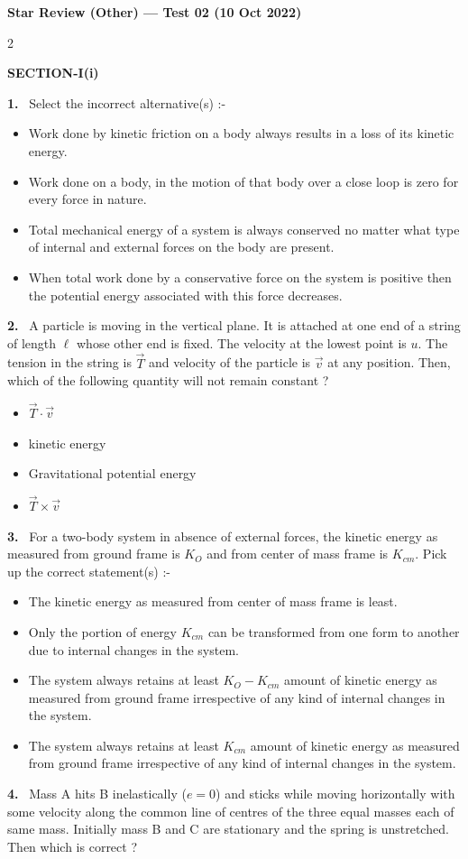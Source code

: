 \documentclass[10pt]{extarticle}
\newcommand{\papersec}[1]{\par\bigskip{\centering\Large\bfseries PAPER-#1\par}\medskip}
\newcommand{\partsec}[2]{\par\medskip\noindent{\large\bfseries PART-#1: #2}\par\smallskip}
\newcommand{\sect}[1]{\par\smallskip\noindent\textbf{#1}\par}
\newcommand{\qn}[1]{\par\smallskip\noindent\textbf{#1.}~}
\newenvironment{qoptions}{\begin{itemize}[leftmargin=1.8em,itemsep=1pt,topsep=2pt,label={}]}{\end{itemize}}
\newcommand{\opt}[2]{\item[(#1)] #2}
\begin{document}
\begin{center}{\Large\bfseries Star Review (Other) --- Test 02 (10 Oct 2022)}\end{center}
\begin{multicols}{2}
\raggedcolumns
\papersec{1}
\partsec{1}{PHYSICS}
\sect{SECTION-I(i)}
\qn{1} Select the incorrect alternative(s) :-
\begin{qoptions}
\opt{A}{Work done by kinetic friction on a body always results in a loss of its kinetic energy.}
\opt{B}{Work done on a body, in the motion of that body over a close loop is zero for every force in nature.}
\opt{C}{Total mechanical energy of a system is always conserved no matter what type of internal and external forces on the body are present.}
\opt{D}{When total work done by a conservative force on the system is positive then the potential energy associated with this force decreases.}
\end{qoptions}
\qn{2} A particle is moving in the vertical plane. It is attached at one end of a string of length $\ell$ whose other end is fixed. The velocity at the lowest point is $u$. The tension in the string is $\vec T$ and velocity of the particle is $\vec v$ at any position. Then, which of the following quantity will not remain constant ?
\begin{qoptions}
\opt{A}{$\vec T\cdot\vec v$}
\opt{B}{kinetic energy}
\opt{C}{Gravitational potential energy}
\opt{D}{$\vec T\times\vec v$}
\end{qoptions}
\qn{3} For a two-body system in absence of external forces, the kinetic energy as measured from ground frame is $K_O$ and from center of mass frame is $K_{cm}$. Pick up the correct statement(s) :-
\begin{qoptions}
\opt{A}{The kinetic energy as measured from center of mass frame is least.}
\opt{B}{Only the portion of energy $K_{cm}$ can be transformed from one form to another due to internal changes in the system.}
\opt{C}{The system always retains at least $K_O-K_{cm}$ amount of kinetic energy as measured from ground frame irrespective of any kind of internal changes in the system.}
\opt{D}{The system always retains at least $K_{cm}$ amount of kinetic energy as measured from ground frame irrespective of any kind of internal changes in the system.}
\end{qoptions}
\qn{4} Mass A hits B inelastically ($e=0$) and sticks while moving horizontally with some velocity along the common line of centres of the three equal masses each of same mass. Initially mass B and C are stationary and the spring is unstretched. Then which is correct ?

\end{multicols}
\end{document}
